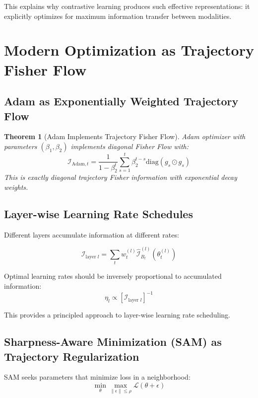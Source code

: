 \documentclass[11pt]{article}
\newtheorem{theorem}{Theorem}
\begin{document}
This explains why contrastive learning produces such effective representations: it explicitly optimizes for maximum information transfer between modalities.

\section{Modern Optimization as Trajectory Fisher Flow}

\subsection{Adam as Exponentially Weighted Trajectory Flow}

\begin{theorem}[Adam Implements Trajectory Fisher Flow]
Adam optimizer with parameters $(\beta_1, \beta_2)$ implements diagonal Fisher Flow with:
\begin{equation}
\mathcal{I}_{\text{Adam},t} = \frac{1}{1-\beta_2^t} \sum_{s=1}^t \beta_2^{t-s} \text{diag}(g_s \odot g_s)
\end{equation}
This is exactly diagonal trajectory Fisher information with exponential decay weights.
\end{theorem}

\subsection{Layer-wise Learning Rate Schedules}

Different layers accumulate information at different rates:

\begin{equation}
\mathcal{I}_{\text{layer } l} = \sum_t w_t^{(l)} \hat{\mathcal{I}}_{B_t}^{(l)}(\theta_t^{(l)})
\end{equation}

Optimal learning rates should be inversely proportional to accumulated information:
\begin{equation}
\eta_l \propto [\mathcal{I}_{\text{layer } l}]^{-1}
\end{equation}

This provides a principled approach to layer-wise learning rate scheduling.

\subsection{Sharpness-Aware Minimization (SAM) as Trajectory Regularization}

SAM seeks parameters that minimize loss in a neighborhood:
\begin{equation}
\min_\theta \max_{\|\epsilon\| \leq \rho} \mathcal{L}(\theta + \epsilon)
\end{equation}
\end{document}
